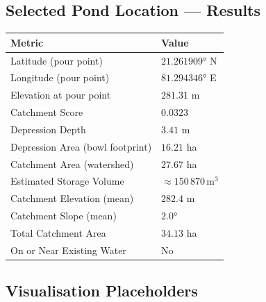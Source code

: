 \documentclass[12pt,a4paper]{article}
\begin{document}
\subsection{Selected Pond Location --- Results}

\begin{center}
\begin{tabular}{ll}
    \toprule
    \textbf{Metric}                & \textbf{Value} \\
    \midrule
    Latitude (pour point)          & $21.261909°$ N \\
    Longitude (pour point)         & $81.294346°$ E \\
    Elevation at pour point        & $281.31$ m \\
    Catchment Score                & $0.0323$ \\
    Depression Depth               & $3.41$ m \\
    Depression Area (bowl footprint)& $16.21$ ha \\
    Catchment Area (watershed)     & $27.67$ ha \\
    Estimated Storage Volume       & $\approx 150\,870\,\text{m}^3$ \\
    Catchment Elevation (mean)     & $282.4$ m \\
    Catchment Slope (mean)         & $2.0°$ \\
    Total Catchment Area           & $34.13$ ha \\
    On or Near Existing Water      & No \\
    \bottomrule
\end{tabular}
\end{center}

\subsection{Visualisation Placeholders}
\end{document}
